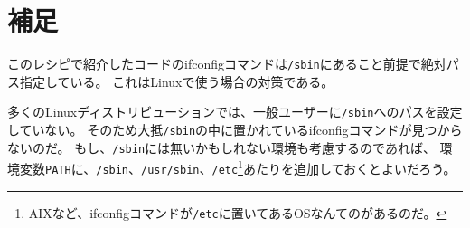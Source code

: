 \section*{補足}

このレシピで紹介したコードのifconfigコマンドは\verb|/sbin|にあること前提で絶対パス指定している。
これはLinuxで使う場合の対策である。

多くのLinuxディストリビューションでは、一般ユーザーに\verb|/sbin|へのパスを設定していない。
そのため大抵\verb|/sbin|の中に置かれているifconfigコマンドが見つからないのだ。
もし、\verb|/sbin|には無いかもしれない環境も考慮するのであれば、
環境変数\verb|PATH|に、\verb|/sbin|、\verb|/usr/sbin|、\verb|/etc|\footnote{AIXなど、ifconfigコマンドが\verb|/etc|に置いてあるOSなんてのがあるのだ。}あたりを追加しておくとよいだろう。 

